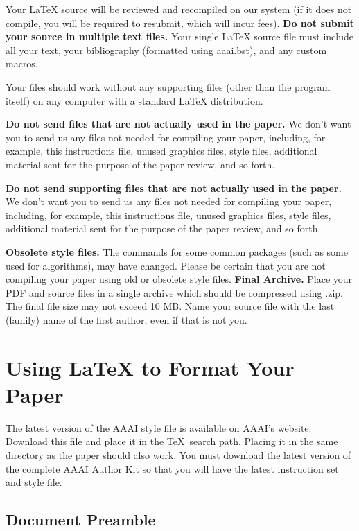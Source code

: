\documentclass[letterpaper]{article} %
\begin{document}
Your \LaTeX{} source will be reviewed and recompiled on our system (if it does not compile, you will be required to resubmit, which will incur fees). \textbf{Do not submit your source in multiple text files.} Your single \LaTeX{} source file must include all your text, your bibliography (formatted using aaai.bst), and any custom macros. 

Your files should work without any supporting files (other than the program itself) on any computer with a standard \LaTeX{} distribution. 

\textbf{Do not send files that are not actually used in the paper.} We don't want you to send us any files not needed for compiling your paper, including, for example, this instructions file, unused graphics files, style files, additional material sent for the purpose of the paper review, and so forth.

\textbf{Do not send supporting files that are not actually used in the paper.} We don't want you to send us any files not needed for compiling your paper, including, for example, this instructions file, unused graphics files, style files, additional material sent for the purpose of the paper review, and so forth.

\textbf{Obsolete style files.} The commands for some common packages (such as some used for algorithms), may have changed. Please be certain that you are not compiling your paper using old or obsolete style files. 
\textbf{Final Archive.} Place your PDF and source files in a single archive which should be compressed using .zip. The final file size may not exceed 10 MB.
Name your source file with the last (family) name of the first author, even if that is not you.


\section{Using \LaTeX{} to Format Your Paper}

The latest version of the AAAI style file is available on AAAI's website. Download this file and place it in the \TeX\ search path. Placing it in the same directory as the paper should also work. You must download the latest version of the complete AAAI Author Kit so that you will have the latest instruction set and style file.

\subsection{Document Preamble}
\end{document}
